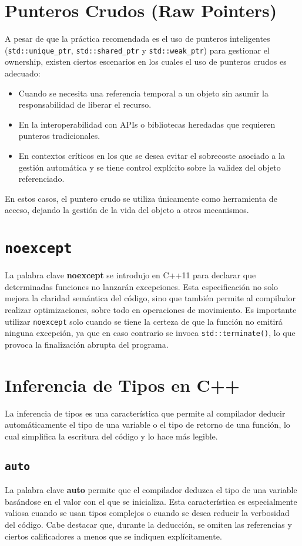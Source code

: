 \documentclass{article}
\begin{document}
\section{Punteros Crudos (Raw Pointers)}
A pesar de que la práctica recomendada es el uso de punteros inteligentes (\texttt{std::unique\_ptr}, \texttt{std::shared\_ptr} y \texttt{std::weak\_ptr}) para gestionar el ownership, existen ciertos escenarios en los cuales el uso de punteros crudos es adecuado:
\begin{itemize}
    \item Cuando se necesita una referencia temporal a un objeto sin asumir la responsabilidad de liberar el recurso.
    \item En la interoperabilidad con APIs o bibliotecas heredadas que requieren punteros tradicionales.
    \item En contextos críticos en los que se desea evitar el sobrecoste asociado a la gestión automática y se tiene control explícito sobre la validez del objeto referenciado.
\end{itemize}
En estos casos, el puntero crudo se utiliza únicamente como herramienta de acceso, dejando la gestión de la vida del objeto a otros mecanismos.

\section{\texttt{noexcept}}
La palabra clave \textbf{noexcept} se introdujo en C++11 para declarar que determinadas funciones no lanzarán excepciones. Esta especificación no solo mejora la claridad semántica del código, sino que también permite al compilador realizar optimizaciones, sobre todo en operaciones de movimiento. Es importante utilizar \texttt{noexcept} solo cuando se tiene la certeza de que la función no emitirá ninguna excepción, ya que en caso contrario se invoca \texttt{std::terminate()}, lo que provoca la finalización abrupta del programa.

\section{Inferencia de Tipos en C++}
La inferencia de tipos es una característica que permite al compilador deducir automáticamente el tipo de una variable o el tipo de retorno de una función, lo cual simplifica la escritura del código y lo hace más legible.

\subsection{\texttt{auto}}
La palabra clave \textbf{auto} permite que el compilador deduzca el tipo de una variable basándose en el valor con el que se inicializa. Esta característica es especialmente valiosa cuando se usan tipos complejos o cuando se desea reducir la verbosidad del código. Cabe destacar que, durante la deducción, se omiten las referencias y ciertos calificadores a menos que se indiquen explícitamente.
\end{document}
